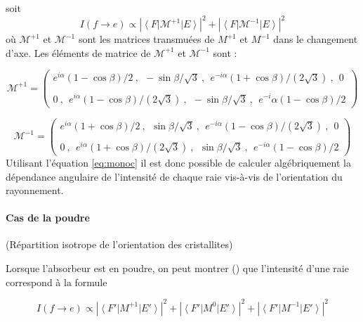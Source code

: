 soit 
\begin{equation}
\label{eq:monoc}
I(f \rightarrow e) \propto \left| \left\langle F\right| \mathcal{M}^{+1} \left|E\right\rangle \right|^2  
      + \left| \left\langle F\right| \mathcal{M}^{-1} \left|E\right\rangle \right|^2
\end{equation}
où  $\mathcal{M}^{+1}$ et $\mathcal{M}^{-1}$ sont les matrices transmuées de $M^{+1}$ et $M^{-1}$ dans le changement d'axe. 
Les éléments de matrice de $\mathcal{M}^{+1}$ et $\mathcal{M}^{-1}$ sont :

\begin{equation*}
\mathcal{M}^{+1}=\left(\begin{array}{cccc}
e^{i\alpha}(1-\cos{\beta})/2~,~~ -\sin{\beta}/\sqrt{3} ~,~~ e^{-i\alpha}( 1+\cos{\beta})/(2\sqrt{3})~,~~0\\
\\
0~,~~ e^{i\alpha}(1-\cos{\beta})/(2\sqrt{3})~,~~-\sin{\beta}/\sqrt{3}~,~~ e^{-i}\alpha(1-\cos{\beta})/2
\end{array}\right)
\end{equation*}

\begin{equation*}
\mathcal{M}^{-1}=\left(\begin{array}{c}
e^{i\alpha}(1+\cos{\beta})/2~,~~ \sin{\beta}/\sqrt{3}~,~~e^{-i\alpha}( 1-\cos{\beta})/(2\sqrt{3})~,~~0\\
\\
0~,~~e^{i\alpha}(1+\cos{\beta})/(2\sqrt{3})~,~~\sin{\beta}/\sqrt{3}~,~~ e^{-i\alpha}(1-\cos{\beta})/2
\end{array}\right)
\end{equation*}
Utilisant l'équation \eqref{eq:monoc} il est donc possible de calculer algébriquement la dépendance angulaire de l'intensité de chaque raie vis-à-vis de l'orientation du rayonnement. 

\paragraph{Cas de la poudre} (Répartition isotrope de l'orientation des cristallites)

Lorsque l'absorbeur est en poudre, on peut montrer (\cite{gabriel-methodo})  que l'intensité d'une raie correspond à la formule 

\begin{equation}
I(f \rightarrow e) \propto \left| \left\langle F'\right| M^{+1} \left|E'\right\rangle \right|^2  
      + \left| \left\langle F'\right| M^{0} \left|E'\right\rangle \right|^2
      + \left| \left\langle F'\right| M^{-1} \left|E'\right\rangle \right|^2
\end{equation}


